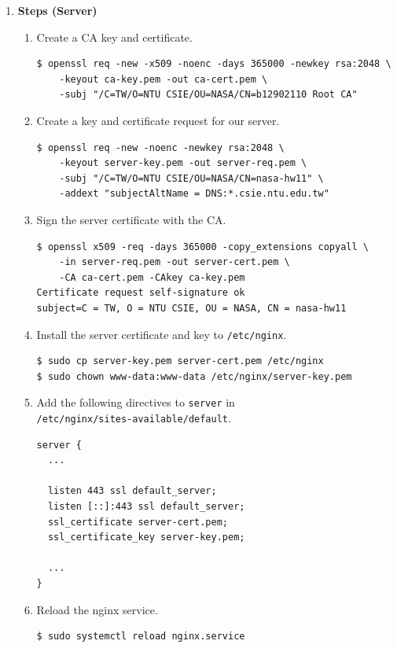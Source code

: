 \documentclass[12pt, a4paper]{article}
\begin{document}
\begin{enumerate}[resume]
    \begin{enumerate}[resume]
      \item \textbf{Steps (Server)}
      \begin{enumerate}[label=(\arabic*)]
        \item Create a CA key and certificate.
        \begin{Verbatim}[frame=single]
$ openssl req -new -x509 -noenc -days 365000 -newkey rsa:2048 \
    -keyout ca-key.pem -out ca-cert.pem \
    -subj "/C=TW/O=NTU CSIE/OU=NASA/CN=b12902110 Root CA"
        \end{Verbatim}
        \item Create a key and certificate request for our server.
        \begin{Verbatim}[frame=single]
$ openssl req -new -noenc -newkey rsa:2048 \
    -keyout server-key.pem -out server-req.pem \
    -subj "/C=TW/O=NTU CSIE/OU=NASA/CN=nasa-hw11" \
    -addext "subjectAltName = DNS:*.csie.ntu.edu.tw"
        \end{Verbatim}
        \item Sign the server certificate with the CA.
        \begin{Verbatim}[frame=single]
$ openssl x509 -req -days 365000 -copy_extensions copyall \
    -in server-req.pem -out server-cert.pem \
    -CA ca-cert.pem -CAkey ca-key.pem
Certificate request self-signature ok
subject=C = TW, O = NTU CSIE, OU = NASA, CN = nasa-hw11
        \end{Verbatim}
        \item Install the server certificate and key to \verb|/etc/nginx|.
        \begin{Verbatim}[frame=single]
$ sudo cp server-key.pem server-cert.pem /etc/nginx
$ sudo chown www-data:www-data /etc/nginx/server-key.pem
        \end{Verbatim}
        \item Add the following directives to \verb|server| in\\
        \verb|/etc/nginx/sites-available/default|.
        \begin{Verbatim}[frame=single]
server {
  ...

  listen 443 ssl default_server;
  listen [::]:443 ssl default_server;
  ssl_certificate server-cert.pem;
  ssl_certificate_key server-key.pem;

  ...
}
        \end{Verbatim}
        \item Reload the nginx service.
        \begin{Verbatim}[frame=single]
$ sudo systemctl reload nginx.service
        \end{Verbatim}
      \end{enumerate}


\end{enumerate}
\end{enumerate}
\end{document}
